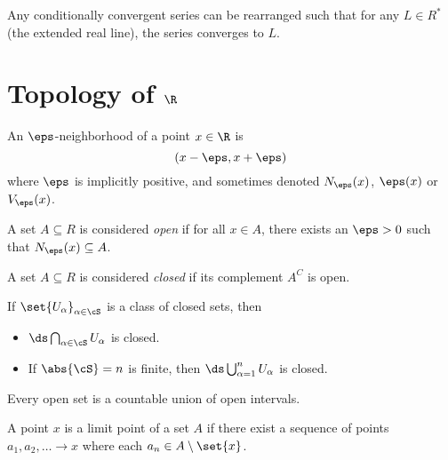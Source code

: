 \documentclass{article}
\begin{document}
\begin{thm}\label{thm:riemann-rearrangement}
  Any conditionally convergent series can be rearranged such that for any $L \in R^{*}$ (the extended real line),
  the series converges to $L$.
\end{thm}

\section{Topology of $\R$}

\begin{defn}\label{defn:epsilon-neighborhood}
  An $\eps$-neighborhood of a point $x \in \R$ is
  \[ (x - \eps, x + \eps) \]
  where $\eps$ is implicitly positive,
  and sometimes denoted $N_{\eps}(x)$, $\eps(x)$ or $V_{\eps}(x)$.
\end{defn}

\begin{defn}\label{defn:open-set}
  A set $A \subseteq R$ is considered \emph{open} if for all $x \in A$, there exists an $\eps > 0$ such that
  $N_{\eps}(x) \subseteq A$.
\end{defn}

\begin{defn}\label{defn:closed-set}
  A set $A \subseteq R$ is considered \emph{closed} if its complement $A^{C}$ is open.
\end{defn}

\begin{thm}\label{thm:union-closed-sets}
  If $\set{U_{\alpha}}_{\alpha \in \cS}$ is a class of closed sets, then
  \begin{itemize}
    \item $\ds\bigcap_{\alpha \in \cS}U_{\alpha}$ is closed.
    \item If $\abs{\cS} = n$ is finite, then $\ds\bigcup_{\alpha = 1}^{n}U_{\alpha}$ is closed.
  \end{itemize}
\end{thm}

\begin{prop}
  Every open set is a countable union of open intervals.
\end{prop}

\begin{defn}\label{defn:limit-point}
  A point $x$ is a limit point of a set $A$ if there exist a sequence of points $a_{1}, a_{2}, \ldots \to x$ where each $a_{n} \in A \setminus \set{x}$.
\end{defn}
\end{document}
